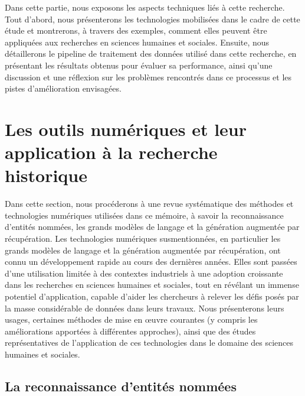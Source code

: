 \documentclass[a4paper,twoside,12pt]{book}
\begin{document}
Dans cette partie, nous exposons les aspects techniques liés à cette recherche. Tout d'abord, nous présenterons les technologies mobilisées dans le cadre de cette étude et montrerons, à travers des exemples, comment elles peuvent être appliquées aux recherches en sciences humaines et sociales. Ensuite, nous détaillerons le pipeline de traitement des données utilisé dans cette recherche, en présentant les résultats obtenus pour évaluer sa performance, ainsi qu'une discussion et une réflexion sur les problèmes rencontrés dans ce processus et les pistes d'amélioration envisagées.


\section{Les outils numériques et leur application à la recherche historique}

Dans cette section, nous procéderons à une revue systématique des méthodes et technologies numériques utilisées dans ce mémoire, à savoir la reconnaissance d'entités nommées, les grands modèles de langage et la génération augmentée par récupération. Les technologies numériques susmentionnées, en particulier les grands modèles de langage et la génération augmentée par récupération, ont connu un développement rapide au cours des dernières années. Elles sont passées d'une utilisation limitée à des contextes industriels à une adoption croissante dans les recherches en sciences humaines et sociales, tout en révélant un immense potentiel d'application, capable d'aider les chercheurs à relever les défis posés par la masse considérable de données dans leurs travaux. Nous présenterons leurs usages, certaines méthodes de mise en œuvre courantes (y compris les améliorations apportées à différentes approches), ainsi que des études représentatives de l'application de ces technologies dans le domaine des sciences humaines et sociales.

\subsection{La reconnaissance d'entités nommées}
\end{document}
